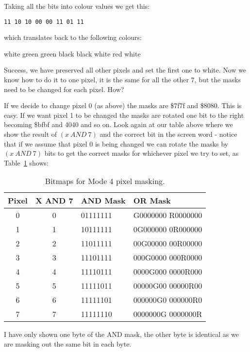 Taking all the bits into colour values we get this:

\begin{lstlisting}[firstnumber=1,frame=none,numbers=none]
11 10 10 00 00 11 01 11
\end{lstlisting}

which translates back to the following colours:

white green green black black white red white

Success, we have preserved all other pixels and set the first one to
    white. Now we know how to do it to one pixel, it is the same for all the
    other 7, but the masks need to be changed for each pixel. How?

If we decide to change pixel 0 (as above) the masks are \$7f7f and
    \$8080. This is easy. If we want pixel 1 to be changed the masks are
    rotated one bit to the right becoming \$bfbf and 4040 and so on. Look again
    at our table above where we show the result of $(x~AND~7)$ and the correct
    bit in the screen word -{} notice that if we assume that pixel 0 is being
    changed we can rotate the masks by $(x~AND~7)$ bits to get the correct masks
    for whichever pixel we try to set, as Table~\ref{tab:BitmapsForMode4PixelMasking} shows:

\begin{table}[htbp]
\centering
\begin{tabular}{c c l l}
\toprule
\textbf{Pixel} & \textbf{X AND 7} & \textbf{AND Mask} & \textbf{OR Mask} \\
\midrule
%
0 & 0 & 01111111 & G0000000 R0000000 \\
1 & 1 & 10111111 & 0G000000 0R000000 \\
2 & 2 & 11011111 & 00G00000 00R00000 \\
3 & 3 & 11101111 & 000G0000 000R0000 \\
4 & 4 & 11110111 & 0000G000 0000R000 \\
5 & 5 & 11111011 & 00000G00 00000R00 \\
6 & 6 & 11111101 & 000000G0 000000R0 \\
7 & 7 & 11111110 & 0000000G 0000000R \\
%
\bottomrule
\end{tabular}
\caption{Bitmaps for Mode 4 pixel masking.}
\label{tab:BitmapsForMode4PixelMasking}
\end{table}

\begin{note}
I have only shown one byte of the AND mask, the other byte is
      identical as we are masking out the same bit in each byte.
\end{note}

